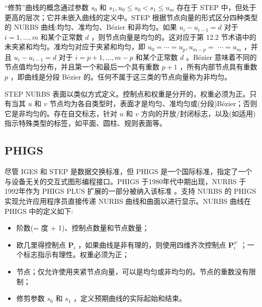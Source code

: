 \documentclass[../main.tex]{subfiles}
\begin{document}
“修剪”曲线的概念通过参数 \({s}_{0}\) 和 \({s}_{1},{u}_{0} \leq  {s}_{0} < {s}_{1} \leq  {u}_{m}\) 存在于 STEP 中，但处于更高的层次；它并未嵌入曲线的定义中。STEP 根据节点向量的形式区分四种类型的 NURBS 曲线:均匀、准均匀、Bézier 和非均匀。如果 \({u}_{i} - {u}_{i - 1} = d\) 对于 \(i = 1,\ldots ,m\) 和某个正常数 \(d\) ，则节点向量是均匀的。这对应于第 12.2 节术语中的未夹紧和均匀。准均匀对应于夹紧和均匀，即 \({u}_{0} = \cdots  = {u}_{p},{u}_{m - p} =\)  \(\cdots  = {u}_{m}\) ，并且 \({u}_{i} - {u}_{i - 1} = d\) 对于 \(i = p + 1,\ldots ,m - p\) 和某个正常数 \(d\) 。Bézier 意味着不同的节点值均匀分布，并且第一个和最后一个具有重数 \(p + 1\) ，所有内部节点具有重数 \(p\) ，即曲线是分段 Bézier 的。任何不属于这三类的节点向量称为非均匀。

STEP NURBS 表面以类似方式定义。控制点和权重是分开的，权重必须为正。只有当其 \(u\) 和 \(v\) 节点均为各自类型时，表面才是均匀、准均匀或(分段)Bézier；否则它是非均匀的。存在自交标志，针对 \(u\) 和 \(v\) 方向的开放/封闭标志，以及(如适用)指示特殊类型的标签，如平面、圆柱、规则表面等。


\subsection{PHIGS}

尽管 IGES 和 STEP 是数据交换标准，但 PHIGS 是一个国际标准，指定了一个与设备无关的交互式图形编程接口。PHIGS 于1980年代中期出现，NURBS 于1992年作为 PHIGS PLUS 扩展的一部分被纳入该标准 \cite{Howa91b}。支持 NURBS 的 PHIGS 实现允许应用程序员直接传递 NURBS 曲线和曲面以进行显示。NURBS 曲线在 PHIGS 中的定义如下:

\begin{itemize}
\item 阶数(= 度 + 1)、控制点数量和节点数量；
\end{itemize}

\begin{itemize}
\item 欧几里得控制点 \({\mathbf{P}}_{i}\) ，如果曲线是非有理的，则使用四维齐次控制点 \({\mathbf{P}}_{i}^{w}\) ；一个标志指示有理性。权重必须为正；
\end{itemize}

\begin{itemize}
\item 节点；仅允许使用夹紧节点向量，可以是均匀或非均匀的。节点的重数没有限制；
\end{itemize}

\begin{itemize}
\item 修剪参数 \({s}_{0}\) 和 \({s}_{1}\) ，定义预期曲线的实际起始和结束。
\end{itemize}
\end{document}
